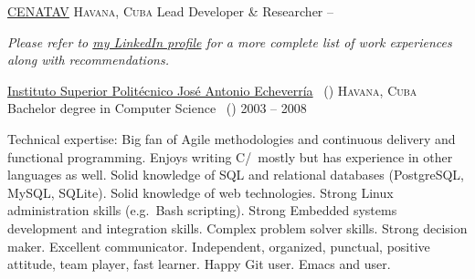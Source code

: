 \documentclass[10pt,a4paper]{article}
\begin{document}
\headedsection
  {\href{http://www.cenatav.co.cu}{CENATAV}}
  {\textsc{Havana, Cuba}} {%
  \headedsubsection
    {Lead Developer \& Researcher}
    { -- }
    {}
}

\vspace{-0.2em}
\begin{center}
  \emph{\small Please refer to \href{http://www.linkedin.com/in/jvillasante}{my LinkedIn profile} for a more complete list of work experiences along with recommendations.}
\end{center}


\spacedhrule{-0.2em}{-0.4em}


\headedsection
  {\href{http://cujae.edu.cu}{Instituto Superior Polit\'ecnico Jos\'e Antonio Echeverr\'ia} \textnormal{~()}}
  {\textsc{Havana, Cuba}} {%
  \headedsubsection
    {Bachelor degree in Computer Science \textnormal{~()}}
    {2003 -- 2008}
    {}
}

\spacedhrule{0.5em}{-0.4em}


\inlineheadsection  %
  {Technical expertise:}
  {Big fan of Agile methodologies and continuous delivery and functional programming. Enjoys writing C/\nsp\CPP\nsp\ mostly but has experience in other languages as well. Solid knowledge of SQL and relational databases (PostgreSQL, MySQL, SQLite). Solid knowledge of web technologies. Strong Linux administration skills (e.g.\ Bash scripting). Strong Embedded systems development and integration skills. Complex problem solver skills. Strong decision maker. Excellent communicator. Independent, organized, punctual, positive attitude, team player, fast learner. Happy Git user. Emacs and  user.}
\end{document}
